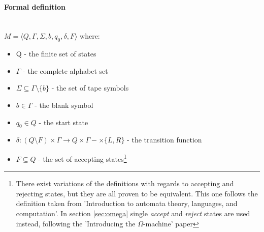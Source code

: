\documentclass[12pt,a4,xcolor=table]{article}
\begin{document}
\paragraph{Formal definition}\hfill\\

$M=\langle Q,\Gamma ,\Sigma,b,q_{0} ,\delta ,F\rangle$
\cite{Hopcroft1979} where:
\begin{multicols}{2}
	\begin{itemize}
		\item Q - the finite set of states
		\item $\Gamma$ - the complete alphabet set
		\item $\Sigma \subseteq \Gamma \setminus \{b\}$ - the set of tape symbols
		\item $b\in\Gamma$ - the blank symbol
		\item $q_{0}\in Q$ - the start state
		\item $\delta :(Q\setminus F)\times \Gamma \rightarrow Q\times \Gamma -  \times \{L,R\}$ - the transition function
		\item $F\subseteq Q$ - the set of accepting states\footnote{There exist variations of the definitions with regards to accepting and rejecting states, but they are all proven to be equivalent. This one follows the definition taken from 'Introduction to automata theory, languages, and computation'\cite{Hopcroft1979}. In section \ref{sec:omega} single \textit{accept} and \textit{reject} states are used instead, following the 'Introducing the $\Omega$-machine' paper\cite{Zhang2014}}
	\end{itemize}
\end{multicols}

\end{document}
